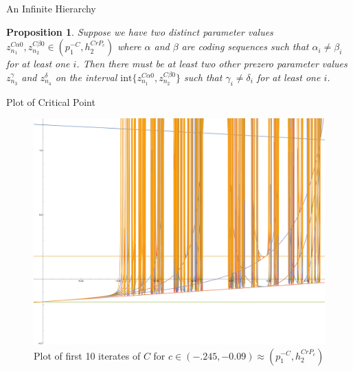 \documentclass{beamer}
\newtheorem{proposition}{\bf Proposition}
\newcommand{\<}{\left\langle}
\renewcommand{\>}{\right\rangle} %
\renewcommand{\*}{\cdot} %
\newcommand{\pl}{p^{-C}_1}
\newcommand{\pr}{h^{CrP_c}_2}
\newcommand{\inte}[2]{\text{int}\{#1,#2\}}
\begin{document}
\begin{frame}{An Infinite Hierarchy}
\begin{proposition}

		Suppose we have two distinct parameter values $z_{n_1}^{C\alpha0}, z_{n_2}^{C\beta0} \in (\pl, \pr)$ where $\alpha$ and $\beta$ are coding sequences such that $\alpha_i \neq \beta_i$ for at least one $i$. Then there must be at least two other prezero parameter values $z_{n_3}^{\gamma}$ and $z_{n_4}^{\delta}$ on the interval $\inte{z_{n_1}^{C\alpha 0}}{z_{n_2}^{C\beta 0}}$ such that $\gamma_i \neq \delta_i$ for at least one $i$.

\end{proposition}
\end{frame}

\begin{frame}{Plot of Critical Point}
	\begin{figure}
		\centering
		\includegraphics[width=.8\textwidth]{./img/10it}
		\caption{\footnotesize Plot of first 10 iterates of $C$ for $c \in (-.245,-0.09) \approx (\pl,\pr)$}
	\end{figure}
\end{frame}
\end{document}

